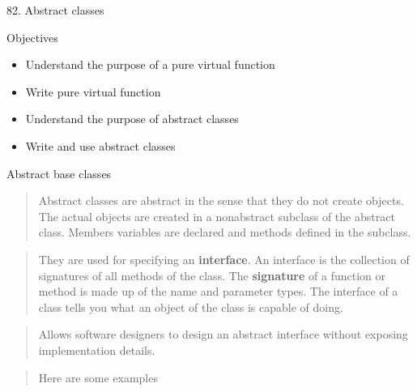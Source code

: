 \documentclass[
]{article}
\author{}
\date{}
\providecommand{\tightlist}{%
  \setlength{\itemsep}{0pt}\setlength{\parskip}{0pt}}
\begin{document}
82. Abstract classes

Objectives

\begin{itemize}
\tightlist
\item
  Understand the purpose of a pure virtual function
\item
  Write pure virtual function
\item
  Understand the purpose of abstract classes
\item
  Write and use abstract classes
\end{itemize}

Abstract base classes

\begin{quote}
\end{quote}

\begin{quote}
Abstract classes are abstract in the sense that they do not create
objects. The actual objects are created in a nonabstract subclass of the
abstract class. Members variables are declared and methods defined in
the subclass.
\end{quote}

\begin{quote}
\end{quote}

\begin{quote}
They are used for specifying an \textbf{interface}. An interface is the
collection of signatures of all methods of the class. The
\textbf{signature} of a function or method is made up of the name and
parameter types. The interface of a class tells you what an object of
the class is capable of doing.
\end{quote}

\begin{quote}
\end{quote}

\begin{quote}
Allows software designers to design an abstract interface without
exposing implementation details.
\end{quote}

\begin{quote}
\end{quote}

\begin{quote}
Here are some examples
\end{quote}

\begin{quote}
\end{quote}
\end{document}
